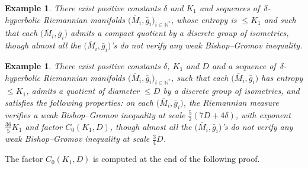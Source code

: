 \documentclass[pdftex]{sigma}
\numberwithin{equation}{section}
\newtheorem{exa}[theor]{Example}
\newcommand{\N}{\mathbb{N}}
\begin{document}
\begin{exa}\label{nonBishopbis} There exist positive constants $\delta$ and $K_1$ and sequences of~$\delta$-hyperbolic
Riemannian manifolds $\big(\overline M_i, \bar g_i\big)_{i \in \N^*}$, whose entropy is $ \le K_1$ and such that each $\big(\overline M_i, \bar g_i\big)$
admits a compact quotient by a discrete group of isometries, though almost all the $\big(\overline M_i, \bar g_i\big)$'s do not verify any weak
Bishop--Gromov inequality.
\end{exa}

\begin{exa}\label{nonBishop} There exist positive constants $\delta$, $K_1$ and $D$ and a sequence of~$\delta$-hyperbolic
Riemannian manifolds $\big(\overline M_i, \bar g_i\big)_{i \in \N^*}$, such that each $\big(\overline M_i, \bar g_i\big)$ has entropy $\le K_1$,
admits a quotient of diameter $\le D$ by a discrete group of isometries, and satisfies the following properties: on each $\big(\overline M_i, \bar g_i\big)$, the
Riemannian measure verifies a weak Bishop--Gromov inequality at scale
$\frac{5}{2} (7 D + 4 \delta)$, with exponent $\frac{36}{5} K_1$ and factor $C_0 (K_1, D)$, though almost all the $\big(\overline M_i, \bar g_i\big)$'s do not verify
any weak Bishop--Gromov inequality at scale $ \frac{3}{4} D$.
\end{exa}

The factor $C_0 (K_1, D)$ is computed at the end of the following proof.
\end{document}

